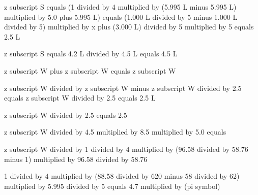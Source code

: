 z subscript S equals (1 divided by 4 multiplied by (5.995 L minus 5.995 L) multiplied by 5.0 plus 5.995 L) equals (1.000 L divided by 5 minus 1.000 L divided by 5) multiplied by x plus (3.000 L) divided by 5 multiplied by 5 equals 2.5 L  

z subscript S equals 4.2 L divided by 4.5 L equals 4.5 L  

z subscript W plus z subscript W equals z subscript W  

z subscript W divided by z subscript W minus z subscript W divided by 2.5 equals z subscript W divided by 2.5 equals 2.5 L  

z subscript W divided by 2.5 equals 2.5  

z subscript W divided by 4.5 multiplied by 8.5 multiplied by 5.0 equals  

z subscript W divided by 1 divided by 4 multiplied by (96.58 divided by 58.76 minus 1) multiplied by 96.58 divided by 58.76  

1 divided by 4 multiplied by (88.58 divided by 620 minus 58 divided by 62) multiplied by 5.995 divided by 5 equals 4.7 multiplied by (pi symbol)